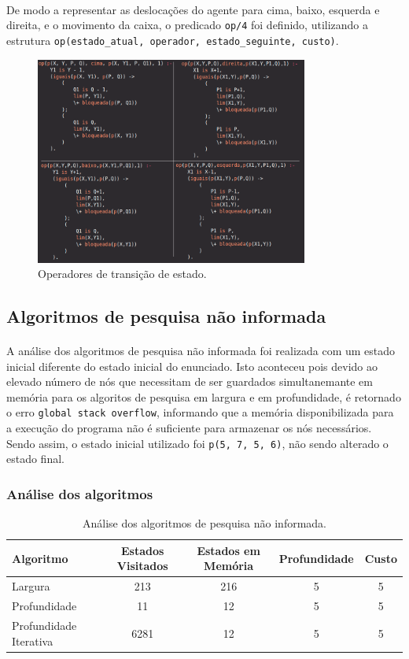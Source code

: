 \documentclass{article}
\begin{document}
\paragraph{} De modo a representar as deslocações do agente para cima, baixo, esquerda e direita, e o movimento da caixa, o predicado \texttt{op/4} foi definido, utilizando a estrutura \texttt{op(estado\_atual, operador, estado\_seguinte, custo)}.

\begin{figure}[h]
\centering
\includegraphics[width=0.8\textwidth]{pi.png}
\caption{\label{fig:op}Operadores de transição de estado.}
\end{figure}

\subsection{Algoritmos de pesquisa não informada}
\paragraph{} A análise dos algoritmos de pesquisa não informada foi realizada com um estado inicial diferente do estado inicial do enunciado. Isto aconteceu pois devido ao elevado número de nós que necessitam de ser guardados simultanemante em memória para os algoritos de pesquisa em largura e em profundidade, é retornado o erro \texttt{global stack overflow}, informando que a memória disponibilizada para a execução do programa não é suficiente para armazenar os nós necessários. Sendo assim, o estado inicial utilizado foi \texttt{p(5, 7, 5, 6)}, não sendo alterado o estado final.
\subsubsection{Análise dos algoritmos}
\begin{table}[h]
\centering
\begin{tabular}{l|c|c|c|c}
Algoritmo & Estados Visitados & Estados em Memória & Profundidade & Custo \\\hline
Largura & 213 & 216 & 5 & 5 \\\hline
Profundidade & 11 & 12 & 5 & 5 \\\hline
Profundidade Iterativa & 6281 & 12 & 5 & 5 
\end{tabular}
\caption{\label{tab:pni}Análise dos algoritmos de pesquisa não informada.}
\end{table}
\end{document}
